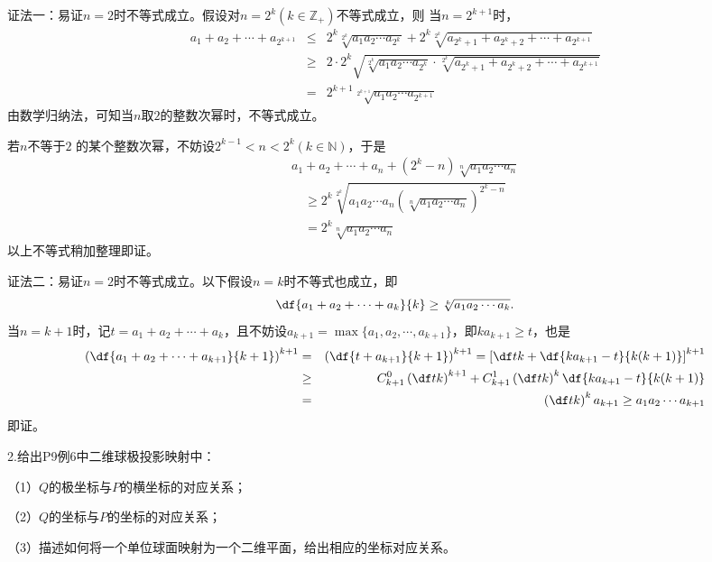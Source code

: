 证法一：易证$n=2$时不等式成立。假设对$n=2^k(k\in\mathbb{Z}_+)$不等式成立，则
当$n=2^{k+1}$时，
\begin{eqnarray*}
	a_1+a_2+\cdots+a_{2^{k+1}}&\leq&2^k\sqrt[2^k]{a_1a_2\cdots a_{2^k}}
	+2^k\sqrt[2^k]{a_{2^k+1}+a_{2^k+2}+\cdots+a_{2^{k+1}}}\\
	&\geq&2\cdot 2^k\sqrt{\sqrt[2^k]{a_1a_2\cdots a_{2^k}}\cdot
	\sqrt[2^k]{a_{2^k+1}+a_{2^k+2}+\cdots+a_{2^{k+1}}}}\\
	&=&2^{k+1}\sqrt[2^{k+1}]{a_1a_2\cdots a_{2^{k+1}}}
\end{eqnarray*}
由数学归纳法，可知当$n$取$2$的整数次幂时，不等式成立。

若$n$不等于$2$
的某个整数次幂，不妨设$2^{k-1}<n<2^k(k\in\mathbb{N})$，于是
\begin{eqnarray*}
	& &a_1+a_2+\cdots+a_n+\left(2^k-n\right)\sqrt[n]{a_1a_2\cdots a_n}\\
	& & \quad\geq 2^k\sqrt[2^k]{a_1a_2\cdots a_n\left(\sqrt[n]{a_1a_2\cdots
	a_n}\right)^{2^k-n}}\\
	& &\quad =2^k\sqrt[n]{a_1a_2\cdots a_n}
\end{eqnarray*}
以上不等式稍加整理即证。

证法二：易证$n=2$时不等式成立。以下假设$n=k$时不等式也成立，即
$$\df{a_1+a_2+\cdots+a_k}{k}\geq\sqrt[k]{a_1a_2\cdots a_k}.$$
当$n=k+1$时，记$t=a_1+a_2+\cdots+a_k$，且不妨设$a_{k+1}=\max\{a_1,a_2,
\cdots,a_{k+1}\}$，即$ka_{k+1}\geq t$，也是
\begin{eqnarray*}
	\left(\df{a_1+a_2+\cdots+a_{k+1}}{k+1}\right)^{k+1}
	&=&\left(\df{t+a_{k+1}}{k+1}\right)^{k+1}
	=\left[\df tk+\df{ka_{k+1}-t}{k(k+1)}\right]^{k+1}\\
	&\geq&C_{k+1}^0\left(\df tk\right)^{k+1}+C_{k+1}^1\left(\df tk\right)^k
	\df{ka_{k+1}-t}{k(k+1)}\\
	&=&\left(\df tk\right)^ka_{k+1}\geq a_1a_2\cdots a_{k+1}
\end{eqnarray*}
即证。
\bigskip

2.给出P9例6中二维球极投影映射中：
  
（1）$Q$的极坐标与$P$的横坐标的对应关系；
  
（2）$Q$的坐标与$P$的坐标的对应关系；
  
（3）描述如何将一个单位球面映射为一个二维平面，给出相应的坐标对应关系。

